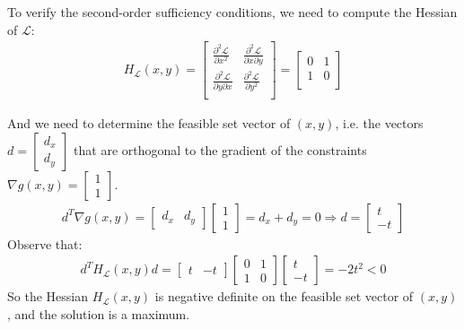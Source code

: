 \documentclass[conference,onecolumn]{IEEEtran}
\begin{document}
\begin{enumerate}
            To verify the second-order sufficiency conditions, we need to compute the Hessian of $\mathcal{L}$:
            \begin{align*}
                  H_{\mathcal{L}}(x, y) = \begin{bmatrix}
                        \frac{\partial^2 \mathcal{L}}{\partial x^2}          & \frac{\partial^2 \mathcal{L}}{\partial x \partial y} \\
                        \frac{\partial^2 \mathcal{L}}{\partial y \partial x} & \frac{\partial^2 \mathcal{L}}{\partial y^2}          \\
                  \end{bmatrix} = \begin{bmatrix}
                        0 & 1 \\
                        1 & 0 \\
                  \end{bmatrix}
            \end{align*}

            And we need to determine the feasible set vector of $(x, y)$, i.e. the vectors $d = \begin{bmatrix}d_x \\ d_y\end{bmatrix}$ that are orthogonal to the gradient of the constraints $\nabla g(x, y) = \begin{bmatrix}1 \\ 1\end{bmatrix}$.
            \begin{align*}
                  d^T \nabla g(x, y) = \begin{bmatrix}d_x & d_y\end{bmatrix} \begin{bmatrix}1 \\ 1\end{bmatrix} = d_x + d_y = 0 \Rightarrow d = \begin{bmatrix}t \\ -t\end{bmatrix}
            \end{align*}
            Observe that:
            \begin{align*}
                  d^T H_{\mathcal{L}}(x, y) d = \begin{bmatrix}t & -t\end{bmatrix} \begin{bmatrix}0 & 1 \\ 1 & 0\end{bmatrix} \begin{bmatrix}t \\ -t\end{bmatrix} = -2t^2 < 0
            \end{align*}
            So the Hessian $H_{\mathcal{L}}(x, y)$ is negative definite on the feasible set vector of $(x, y)$, and the solution is a maximum.


\end{enumerate}
\end{document}

